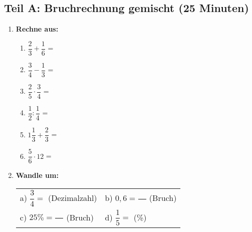 \subsection*{Teil A: Bruchrechnung gemischt (25 Minuten)}

\begin{enumerate}[label=\arabic*.]
    \item \textbf{Rechne aus:}
    \vspace{0.5cm}

    \begin{enumerate}[label=\alph*)]
        \item $\dfrac{2}{3} + \dfrac{1}{6}$ = \underline{\hspace{3cm}}

        \vspace{0.5cm}

        \item $\dfrac{3}{4} - \dfrac{1}{3}$ = \underline{\hspace{3cm}}

        \vspace{0.5cm}

        \item $\dfrac{2}{5} \cdot \dfrac{3}{4}$ = \underline{\hspace{3cm}}

        \vspace{0.5cm}

        \item $\dfrac{1}{2} : \dfrac{1}{4}$ = \underline{\hspace{3cm}}

        \vspace{0.5cm}

        \item $1\dfrac{1}{3} + \dfrac{2}{3}$ = \underline{\hspace{3cm}}

        \vspace{0.5cm}

        \item $\dfrac{5}{6} \cdot 12$ = \underline{\hspace{3cm}}
    \end{enumerate}

    \vspace{1cm}

    \item \textbf{Wandle um:}
    \vspace{0.5cm}

    \begin{tabular}{ll}
        a) $\dfrac{3}{4} = $ \underline{\hspace{2cm}} (Dezimalzahl) & b) $0,6 = \dfrac{\phantom{00}}{\phantom{00}}$ (Bruch) \\[3ex]
        c) $25\% = \dfrac{\phantom{00}}{\phantom{00}}$ (Bruch) & d) $\dfrac{1}{5} = $ \underline{\hspace{2cm}} (\%)
    \end{tabular}

\end{enumerate}